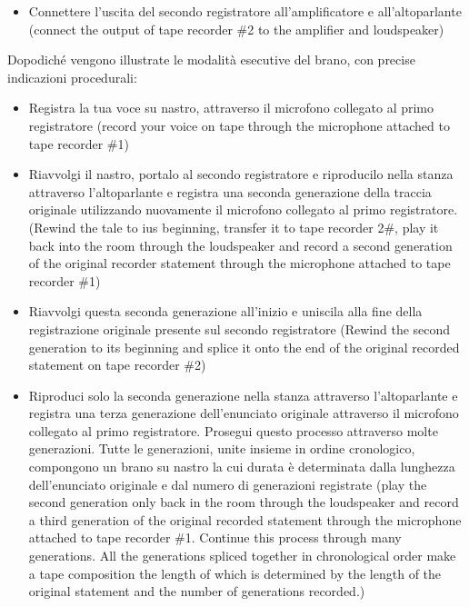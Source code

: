 \begin{itemize}
    \item Connettere l'uscita del secondo registratore all'amplificatore e all'altoparlante (connect the output of tape recorder \#2 to the amplifier and loudspeaker)
\end{itemize}

Dopodiché vengono illustrate le modalità esecutive del brano, con precise indicazioni procedurali:

\begin{itemize}
    \item Registra la tua voce su nastro, attraverso il microfono collegato al primo registratore (record your voice on tape through the microphone attached to tape recorder \#1)
\end{itemize}

\begin{itemize}
    \item Riavvolgi il nastro, portalo al secondo registratore e riproducilo nella stanza attraverso l'altoparlante e registra una seconda generazione della traccia originale utilizzando nuovamente il microfono collegato al primo registratore. (Rewind the tale to ius beginning, transfer it to tape recorder 2\#, play it back into the room through the loudspeaker and record a second generation of the original recorder statement through the microphone attached to tape recorder \#1)
\end{itemize}

\begin{itemize}
    \item Riavvolgi questa seconda generazione all'inizio e uniscila alla fine della registrazione originale presente sul secondo registratore (Rewind the second generation to its beginning and splice it onto the end of the original recorded statement on tape recorder \#2)
\end{itemize}

\begin{itemize}
    \item Riproduci solo la seconda generazione nella stanza attraverso l'altoparlante e registra una terza generazione dell'enunciato originale attraverso il microfono collegato al primo registratore. Prosegui questo processo attraverso molte generazioni. Tutte le generazioni, unite insieme in ordine cronologico, compongono un brano su nastro la cui durata è determinata dalla lunghezza dell'enunciato originale e dal numero di generazioni registrate (play the second generation only back in the room through the loudspeaker and record a third generation of the original recorded statement through the microphone attached to tape recorder \#1. Continue this process through many generations. All the generations spliced together in chronological order make a tape composition the length of which is determined by the length of the original statement and the number of generations recorded.)
\end{itemize}

